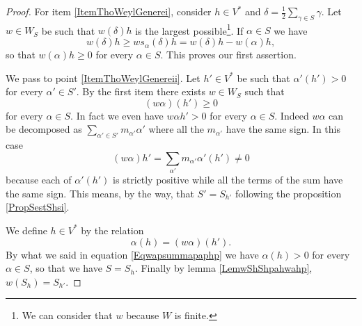 \begin{proof}
    For item \ref{ItemThoWeylGenerei}, consider \( h\in V^*\) and \( \delta=\frac{ 1 }{2}\sum_{\gamma\in S}\gamma\). Let \( w\in W_S\) be such that \( w(\delta)h\) is the largest possible\footnote{We can consider that \( w\) because \( W\) is finite.}. If \( \alpha\in S\) we have
    \begin{equation}
        w(\delta)h\geq ws_{\alpha}(\delta)h=w(\delta)h-w(\alpha)h,
    \end{equation}
    so that \( w(\alpha)h\geq 0\) for every \( \alpha\in S\). This proves our first assertion.

    We pass to point \ref{ItemThoWeylGenereii}. Let \( h'\in V^*\) be such that \( \alpha'(h')> 0\) for every \( \alpha'\in S'\). By the first item there exists \( w\in W_S\) such that
    \begin{equation}
        (w\alpha)(h')\geq 0
    \end{equation}
    for every \( \alpha\in S\). In fact we even have \( w\alpha h'>0\) for every \( \alpha\in S\). Indeed \( w\alpha\) can be decomposed as \( \sum_{\alpha'\in S'}m_{\alpha'}\alpha'\) where all the \( m_{\alpha'}\) have the same sign. In this case
    \begin{equation}        \label{Eqwapsummapaphp}
        (w\alpha)h'=\sum_{\alpha'}m_{\alpha'}\alpha'(h')\neq 0
    \end{equation}
    because each of \( \alpha'(h')\) is strictly positive while all the terms of the sum have the same sign. This means, by the way, that \( S'=S_{h'}\) following the proposition \ref{PropSestShsi}.
    
    We define \( h\in V^*\) by the relation
    \begin{equation}
        \alpha(h)=(w\alpha)(h').
    \end{equation}
    By what we said in equation \eqref{Eqwapsummapaphp} we have \( \alpha(h)>0\) for every \( \alpha\in S\), so that we have \( S=S_h\). Finally by lemma \ref{LemwShShpahwahp}, \( w(S_h)=S_{h'}\).


\end{proof}
